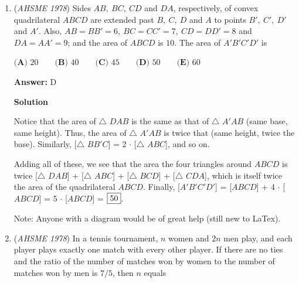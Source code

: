 \begin{enumerate}
 $\textbf{(A) }30^\circ\qquad \textbf{(B) }45^\circ\qquad \textbf{(C) }60^\circ\qquad \textbf{(D) }90^\circ\qquad  \textbf{(E) }120^\circ$

 \textbf{Answer: }E



\textbf{Solution (Repeating Cycles, Kinda )}

Upon graphing more points according to the rule mentioned in the problem, you can visibly see the rule repeats every 8 points (i.e. $A_9$ is the same as $A_1$, and $A_{10}$ is the same as $A_2$, etc.). Through very simple calculations, this means $A_{44}$ becomes $A_4$, $A_{45}$ becomes $A_5$, and $A_{43}$ becomes $A_3$, and you can clearly see on the diagram that this is a 120 degree angle, leading to $\fbox{E}$ as the final answer.

 


	\item (\textit{AHSME 1978}) Sides $AB,~ BC, ~CD$ and $DA$, respectively, of convex quadrilateral $ABCD$ are extended past $B,~ C ,~ D$ and $A$ to points $B',~C',~ D'$ and $A'$. 
Also, $AB = BB' = 6,~ BC = CC' = 7, ~CD = DD' = 8$ and $DA = AA' = 9$; and the area of $ABCD$ is $10$. The area of $A 'B 'C'D'$ is


 $\textbf{(A) }20\qquad \textbf{(B) }40\qquad \textbf{(C) }45\qquad \textbf{(D) }50\qquad  \textbf{(E) }60$

 \textbf{Answer: }D



\textbf{Solution}

Notice that the area of $\triangle$ $DAB$ is the same as that of $\triangle$ $A'AB$ (same base, same height). Thus, the area of $\triangle$ $A'AB$ is twice that (same height, twice the base). Similarly, [$\triangle$ $BB'C$] = 2 $\cdot$ [$\triangle$ $ABC$], and so on.

 Adding all of these, we see that the area the four triangles around $ABCD$ is twice [$\triangle$ $DAB$] + [$\triangle$ $ABC$] + [$\triangle$ $BCD$] + [$\triangle$ $CDA$], which is itself twice the area of the quadrilateral $ABCD$. Finally, [$A'B'C'D'$] = [$ABCD$] + 4 $\cdot$ [$ABCD$] = 5 $\cdot$ [$ABCD$] = $\fbox{50}$.

 Note: Anyone with a diagram would be of great help (still new to LaTex).

 


	\item (\textit{AHSME 1978}) In a tennis tournament, $n$ women and $2n$ men play, and each player plays exactly one match with every other player. 
If there are no ties and the ratio of the number of matches won by women to the number of matches won by men is $7/5$, then $n$ equals



\end{enumerate}
